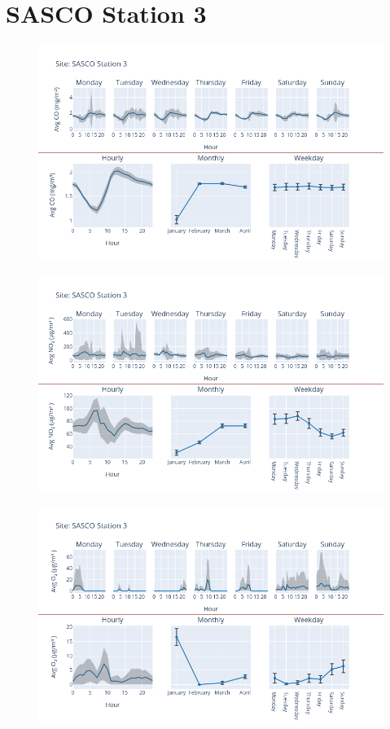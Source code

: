 \documentclass[12pt, oneside]{book}
\begin{document}
{\section{SASCO Station 3}
{\begin{figure}[H] 
 \centering 
\includegraphics[width=.88\textwidth, keepaspectratio]{image146} 
 \end{figure}}{} 

{\begin{figure}[H] 
 \centering 
\includegraphics[width=.88\textwidth, keepaspectratio]{image147} 
 \end{figure}}{} 

{\begin{figure}[H] 
 \centering 
\includegraphics[width=.88\textwidth, keepaspectratio]{image148} 
 \end{figure}}{} 

}
\end{document}
